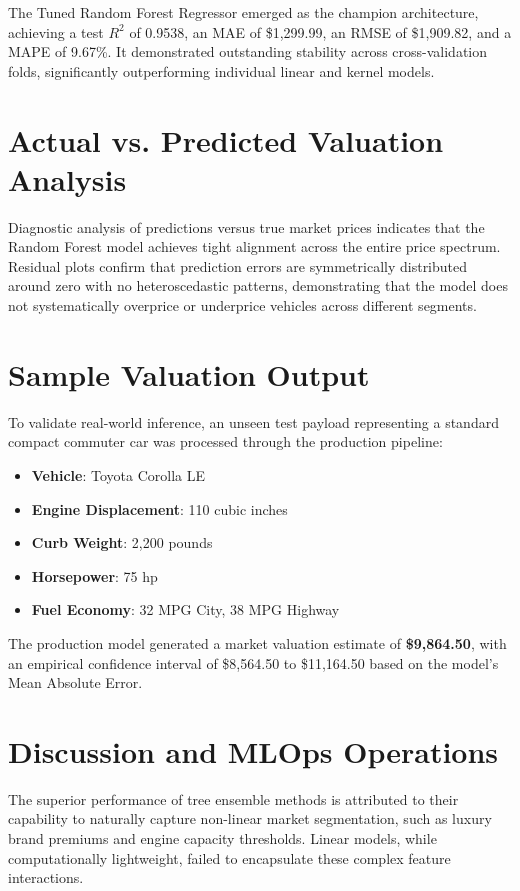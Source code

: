 \documentclass[conference]{IEEEtran}
\begin{document}
The Tuned Random Forest Regressor emerged as the champion architecture, achieving a test $R^2$ of 0.9538, an MAE of \$1,299.99, an RMSE of \$1,909.82, and a MAPE of 9.67\%. It demonstrated outstanding stability across cross-validation folds, significantly outperforming individual linear and kernel models.

\section{Actual vs. Predicted Valuation Analysis}
Diagnostic analysis of predictions versus true market prices indicates that the Random Forest model achieves tight alignment across the entire price spectrum. Residual plots confirm that prediction errors are symmetrically distributed around zero with no heteroscedastic patterns, demonstrating that the model does not systematically overprice or underprice vehicles across different segments.

\section{Sample Valuation Output}
To validate real-world inference, an unseen test payload representing a standard compact commuter car was processed through the production pipeline:
\begin{itemize}
    \item \textbf{Vehicle}: Toyota Corolla LE
    \item \textbf{Engine Displacement}: 110 cubic inches
    \item \textbf{Curb Weight}: 2,200 pounds
    \item \textbf{Horsepower}: 75 hp
    \item \textbf{Fuel Economy}: 32 MPG City, 38 MPG Highway
\end{itemize}

The production model generated a market valuation estimate of \textbf{\$9,864.50}, with an empirical confidence interval of \$8,564.50 to \$11,164.50 based on the model's Mean Absolute Error.

\section{Discussion and MLOps Operations}
The superior performance of tree ensemble methods is attributed to their capability to naturally capture non-linear market segmentation, such as luxury brand premiums and engine capacity thresholds. Linear models, while computationally lightweight, failed to encapsulate these complex feature interactions.
\end{document}

